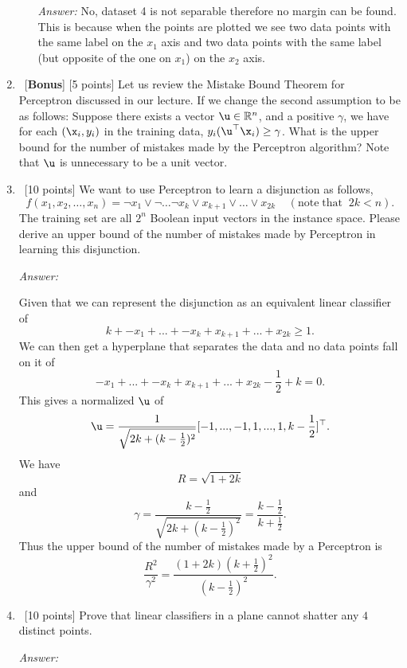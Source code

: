 \documentclass[12pt, fullpage,letterpaper]{article}
\begin{document}
\begin{enumerate}
\begin{enumerate}
			\textit{Answer:}
			No, dataset 4 is not separable therefore no margin can be found. 
			This is because when the points are plotted we see two data points with the same label on the $x_1$ axis and two data points with the same label (but opposite of the one on $x_1$) on the $x_2$ axis.
			
		\end{enumerate}
	
	\item ~[\textbf{Bonus}] [5 points] Let us review the Mistake Bound Theorem for Perceptron discussed in our lecture.  If we change the second assumption to be as follows: Suppose there exists a vector $\u\in \mathbb{R}^n$, and a positive $\gamma$, we have for each $(\x_i, y_i)$ in the training data, $y_i(\u^\top \x_i) \ge \gamma$. What is the upper bound for the number of mistakes made by the Perceptron algorithm?   Note that $\u$ is unnecessary to be a unit vector.
	
	\item~[10 points] We want to use Perceptron to learn a disjunction as follows,
	\[
	f(x_1, x_2, \ldots, x_n) = \neg x_1 \lor \neg \ldots \neg x_k \lor x_{k+1} \lor \ldots \lor x_{2k} \;\;\;\;(\mathrm{note\; that}\;\; 2k < n).
	\]
	The training set are all $2^n$ Boolean input vectors in the instance space. 
	Please derive an upper bound of the number of mistakes made by Perceptron in learning this disjunction.

	\textit{Answer:}

	Given that we can represent the disjunction as an equivalent linear classifier of 
	\[
		k + -x_1 + ... + -x_k + x_{k+1} + ... + x_{2k} \ge 1.
	\]
	We can then get a hyperplane that separates the data and no data points fall on it of 
	\[
		-x_1 + ... + -x_k + x_{k+1} + ... + x_{2k} - \frac{1}{2} + k = 0. 
	\]
	This gives a normalized $\u$ of 
	\[
		\u = \frac{1}{\sqrt{2k + (k - \frac{1}{2})^2}} [-1, ..., -1, 1, ..., 1, k-\frac{1}{2}]^\top.
	\]
	We have 
	\[
		R =\sqrt{1 + 2k}
	\]
	and 
	\[
		\gamma = \frac{k - \frac{1}{2}}{\sqrt{2k + (k - \frac{1}{2})^2}} = \frac{k - \frac{1}{2}}{k + \frac{1}{2}}.
	\]
	Thus the upper bound of the number of mistakes made by a Perceptron is
	\[
		\frac{R^2}{\gamma^2} = \frac{(1 + 2k)(k + \frac{1}{2})^2}{(k - \frac{1}{2})^2}.
	\]


	\item~[10 points] Prove that linear classifiers in a plane cannot shatter any $4$ distinct points. 

	\textit{Answer:}


\end{enumerate}
\end{document}
